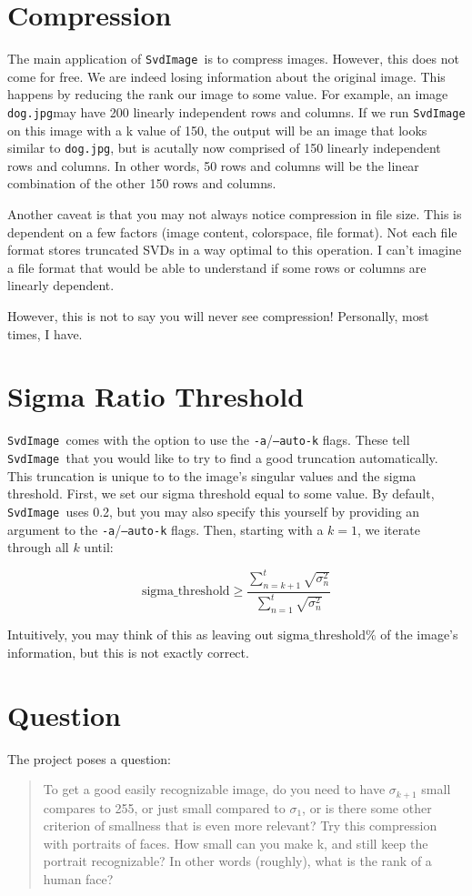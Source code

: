 \documentclass[12pt,letterpaper]{article}
\newcommand{\svdimage}{\texttt{SvdImage }}
\begin{document}
\section{Compression}
The main application of \svdimage is to compress images. However, this does not
come for free. We are indeed losing information about the original image. This
happens by reducing the rank our image to some value. For example, an image
\texttt{dog.jpg}may have 200 linearly independent rows and columns. If we run
\svdimage on this image with a k value of 150, the output will be an image that
looks similar to \texttt{dog.jpg}, but is acutally now comprised of 150 linearly
independent rows and columns. In other words, 50 rows and columns will be the
linear combination of the other 150 rows and columns. 

Another caveat is that you may not always notice compression in file size. This
is dependent on a few factors (image content, colorspace, file format). Not each
file format stores truncated SVDs in a way optimal to this operation. I can't
imagine a file format that would be able to understand if some rows or columns
are linearly dependent.

However, this is not to say you will never see compression! Personally, most
times, I have.

\section{Sigma Ratio Threshold}
\svdimage comes with the option to use the \texttt{-a}/\texttt{--auto-k} flags.
These tell \svdimage that you would like to try to find a good truncation
automatically. This truncation is unique to to the image's singular values and
the sigma threshold. First, we set our sigma threshold equal to some value. By
default, \svdimage uses 0.2, but you may also specify this yourself by providing
an argument to the \texttt{-a}/\texttt{--auto-k} flags. Then, starting with a
$k=1$, we iterate through all $k$ until:

\begin{equation}
\mbox{sigma\_threshold} \geq \frac{\sum_{n=k+1}^{t} \sqrt{\sigma_{n}^{2}}}{\sum_{n=1}^{t} \sqrt{\sigma_{n}^{2}}}
\end{equation}

Intuitively, you may think of this as leaving out $\mbox{sigma\_threshold}\%$ of
the image's information, but this is not exactly correct.

\section{Question}
The project poses a question:
\begin{quote}
To get a good easily recognizable image, do you need to have $\sigma_{k+1}$ small
compares to 255, or just small compared to $\sigma_1$, or is there some other criterion of smallness
that is even more relevant?
Try this compression with portraits of faces. How small can you make k, and still
keep the portrait recognizable? In other words (roughly), what is the rank of a human
face?
\end{quote}
\end{document}
